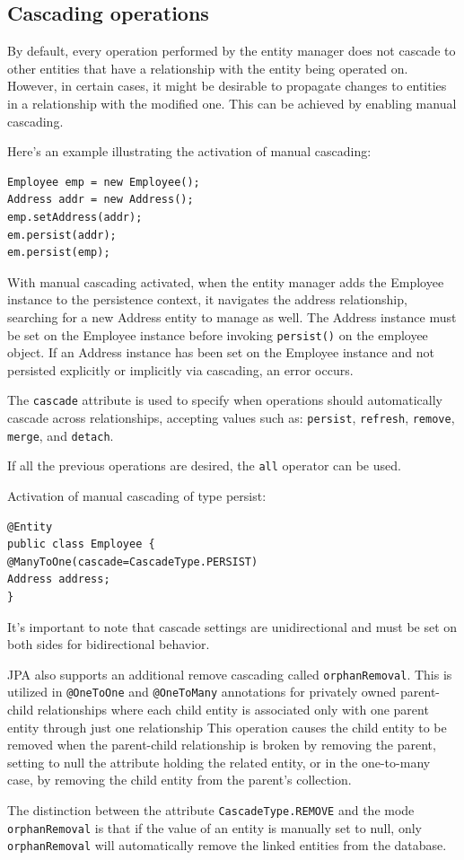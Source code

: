 \subsection{Cascading operations}
By default, every operation performed by the entity manager does not cascade to other entities that have a relationship with the entity being operated on.
However, in certain cases, it might be desirable to propagate changes to entities in a relationship with the modified one. 
This can be achieved by enabling manual cascading.
\begin{example}
    Here's an example illustrating the activation of manual cascading:
    \begin{lstlisting}[style=Java]
Employee emp = new Employee();
Address addr = new Address();
emp.setAddress(addr);
em.persist(addr);
em.persist(emp);
    \end{lstlisting}
    With manual cascading activated, when the entity manager adds the Employee instance to the persistence context, it navigates the address relationship, searching for a new Address entity to manage as well.
    The Address instance must be set on the Employee instance before invoking \texttt{persist()} on the employee object.  
    If an Address instance has been set on the Employee instance and not persisted explicitly or implicitly via cascading, an error occurs.
\end{example}
The \texttt{cascade} attribute is used to specify when operations should automatically cascade across relationships, accepting values such as: \texttt{persist}, \texttt{refresh}, \texttt{remove}, \texttt{merge}, and \texttt{detach}.

If all the previous operations are desired, the \texttt{all} operator can be used.
\begin{example}
    Activation of manual cascading of type persist: 
    \begin{lstlisting}[style=Java]
@Entity
public class Employee {
@ManyToOne(cascade=CascadeType.PERSIST)
Address address;
}
    \end{lstlisting}
\end{example}
It's important to note that cascade settings are unidirectional and must be set on both sides for bidirectional behavior.

JPA also supports an additional remove cascading called \texttt{orphanRemoval}. 
This is utilized in \texttt{@OneToOne} and \texttt{@OneToMany} annotations for privately owned parent-child relationships where each child entity is associated only with one parent entity through just one relationship
This operation causes the child entity to be removed when the parent-child relationship is broken by removing the parent, setting to null the attribute holding the related entity, or in the one-to-many case, by removing the child entity from the parent's collection.

The distinction between the attribute \texttt{CascadeType.REMOVE} and the mode \texttt{orphanRemoval}  is that if the value of an entity is manually set to null, only \texttt{orphanRemoval} will automatically remove the linked entities from the database.